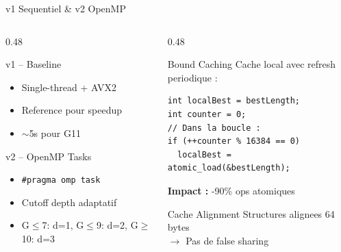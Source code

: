 \documentclass[aspectratio=169,9pt]{beamer}
\begin{document}
\begin{frame}[fragile]{v1 Sequentiel \& v2 OpenMP}
    \begin{columns}[T]
        \begin{column}{0.48\textwidth}
            \begin{block}{v1 -- Baseline}
                \begin{itemize}\small
                    \item Single-thread + AVX2
                    \item Reference pour speedup
                    \item $\sim$5s pour G11
                \end{itemize}
            \end{block}
            \begin{block}{v2 -- OpenMP Tasks}
                \begin{itemize}\small
                    \item \texttt{\#pragma omp task}
                    \item Cutoff depth adaptatif
                    \item G$\leq$7: d=1, G$\leq$9: d=2, G$\geq$10: d=3
                \end{itemize}
            \end{block}
        \end{column}
        \begin{column}{0.48\textwidth}
            \begin{exampleblock}{Bound Caching}
                \small
                Cache local avec refresh periodique :
\begin{lstlisting}
int localBest = bestLength;
int counter = 0;
// Dans la boucle :
if (++counter % 16384 == 0)
  localBest = atomic_load(&bestLength);
\end{lstlisting}
                \textbf{Impact :} -90\% ops atomiques
            \end{exampleblock}
            \begin{alertblock}{Cache Alignment}
                \small
                Structures alignees 64 bytes\\
                $\rightarrow$ Pas de false sharing
            \end{alertblock}
        \end{column}
    \end{columns}
\end{frame}
\end{document}
